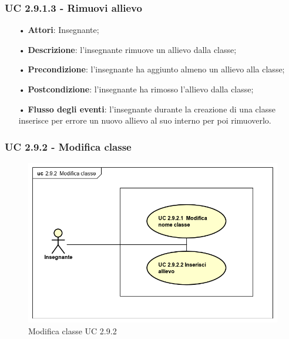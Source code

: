 \subsubsection{UC 2.9.1.3 - Rimuovi allievo}
\begin{itemize}
	\item[•] \textbf{Attori}: Insegnante;
	\item[•] \textbf{Descrizione}: l'insegnante rimuove un allievo dalla classe;
	\item[•] \textbf{Precondizione}: l'insegnante ha aggiunto almeno un allievo alla classe;
	\item[•] \textbf{Postcondizione}: l'insegnante ha rimosso l'allievo dalla classe;
	\item[•] \textbf{Flusso degli eventi}: l'insegnante durante la creazione di una classe inserisce per errore un nuovo allievo al suo interno per poi rimuoverlo.
\end{itemize}


\subsubsection{UC 2.9.2 - Modifica classe}
\begin{figure}[H]
	\centering
	\includegraphics[width=17cm]{img/ModificaClasse.png} 
	\caption{Modifica classe UC 2.9.2}
\end{figure}

